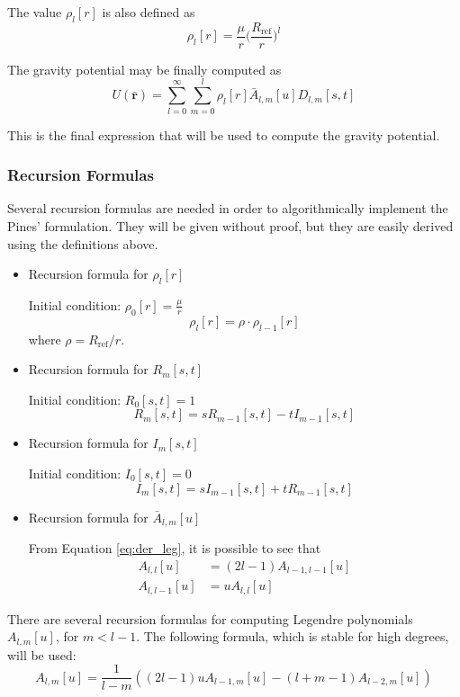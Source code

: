 The value $\rho_l[r]$ is also defined as
\begin{equation}
\rho_l[r] = \frac{\mu}{r} \bigg(\frac{R_{\text{ref}}}{r}\bigg)^l
\end{equation}

The gravity potential may be finally computed as
\begin{equation}
U(\mathbf{\bar r}) = \sum_{l=0}^\infty \sum_{m=0}^l \rho_l[r] \bar A_{l,m}[u] D_{l,m}[s,t]
\end{equation}

This is the final expression that will be used to compute the gravity potential.

\subsubsection{Recursion Formulas}

Several recursion formulas are needed in order to algorithmically implement the Pines' formulation. They will be given without proof, but they are easily derived using the definitions above.
\begin{itemize}


\item{Recursion formula for $\rho_l[r]$}

Initial condition: $\rho_0[r] = \frac{\mu}{r}$
\begin{equation}
\rho_l[r] = \rho \cdot \rho_{l-1}[r]
\end{equation}
where $\rho = R_{\text{ref}}/r$.

\item{Recursion formula for $R_m[s,t]$}

Initial condition: $R_0[s,t] = 1$
\begin{equation}
R_m[s,t] = s R_{m-1}[s,t] - t I_{m-1}[s,t]
\end{equation}

\item{Recursion formula for $I_m[s,t]$}

Initial condition: $I_0[s,t] = 0$
\begin{equation}
I_m[s,t] = s I_{m-1}[s,t] + t R_{m-1}[s,t]
\end{equation}

\item{Recursion formula for $\bar A_{l,m}[u]$}

From Equation \eqref{eq:der_leg}, it is possible to see that
\begin{align}
	A_{l,l}[u] &= (2 l -1) A_{l-1,l-1}[u]\label{eq:All}\\
	A_{l,l-1}[u] &= u A_{l,l}[u]\label{eq:All_1}
\end{align}
\end{itemize}
There are several recursion formulas for computing Legendre polynomials $A_{l,m}[u]$, for $m < l-1$. The following formula, which is stable for high degrees\cite{lundberg1988}, will be used:
\begin{equation}
A_{l,m}[u] = \frac{1}{l-m} ((2 l -1) u A_{l-1,m}[u] - (l+m-1) A_{l-2,m}[u])\label{eq:Alm}
\end{equation}


